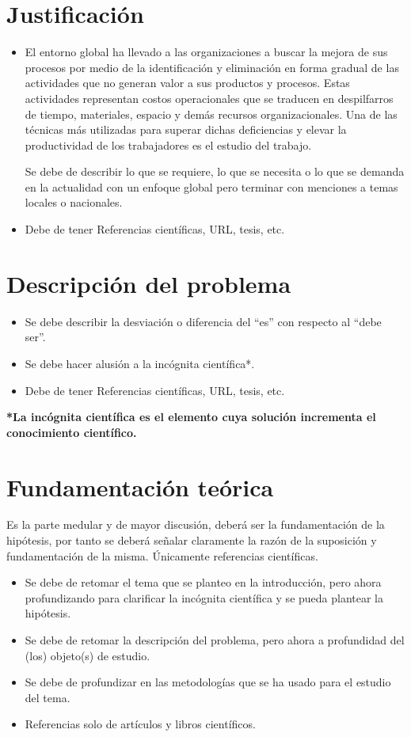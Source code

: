     \section{Justificación}
    
    \begin{itemize}
        \item El entorno global ha llevado a las organizaciones a buscar la mejora de sus procesos por medio de la identificación y eliminación en forma gradual de las actividades que no generan valor a sus productos y procesos. Estas actividades representan costos operacionales que se traducen en despilfarros de tiempo, materiales, espacio y demás recursos organizacionales. Una de las técnicas más utilizadas para superar dichas deficiencias y elevar la productividad de los trabajadores es el estudio del trabajo.
        
        Se debe de describir lo que se requiere, lo que se necesita o lo que se demanda en la actualidad con un enfoque global pero terminar con menciones a temas locales o nacionales.
        \item Debe de tener Referencias científicas, URL, tesis, etc.
    \end{itemize}
    \section{Descripción del problema}
    \begin{itemize}
        \item Se debe describir la desviación o diferencia del ``es'' con respecto al ``debe ser''.
        \item Se debe hacer alusión a la incógnita científica*.
        \item Debe de tener Referencias científicas, URL, tesis, etc.
    \end{itemize}
    
    \textbf{*La incógnita científica es el elemento cuya solución incrementa el conocimiento científico.}
    \section{Fundamentación teórica}
    
    Es la parte medular y de mayor discusión, deberá ser la fundamentación de la hipótesis, por tanto se deberá señalar claramente la razón de la suposición y fundamentación de la misma. Únicamente referencias científicas.
    \begin{itemize}
        \item Se debe de retomar el tema que se planteo en la introducción, pero ahora profundizando para clarificar la incógnita científica y se pueda plantear la hipótesis.
        \item Se debe de retomar la descripción del problema, pero ahora a profundidad del (los) objeto(s) de estudio. 
        \item Se debe de profundizar en las metodologías que se ha usado para el estudio del tema.
        \item Referencias solo de artículos y libros científicos.
    \end{itemize}
